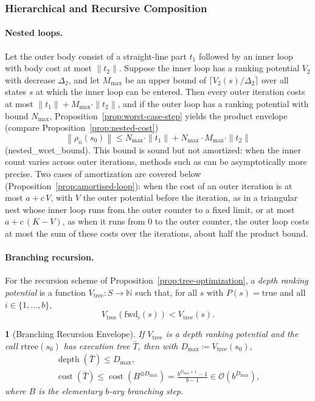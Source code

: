 \documentclass[oneside,english]{amsart}
\numberwithin{equation}{section}
\numberwithin{figure}{section}
\theoremstyle{plain}
\theoremstyle{definition}
\theoremstyle{plain}
\newtheorem{prop}[thm]{\protect\propositionname}
\theoremstyle{remark}
\theoremstyle{plain}
\theoremstyle{definition}
\theoremstyle{plain}
\theoremstyle{remark}
\DeclareMathOperator{\cost}{cost}
\DeclareMathOperator{\depth}{depth}
\newcommand{\lean}[1]{{\ttfamily\small #1}}
\providecommand{\propositionname}{Proposition}
\begin{document}
\subsubsection{Hierarchical and Recursive Composition}
\label{subsubsec:compositional-wcet}

\paragraph{Nested loops.}
Let the outer body consist of a straight-line part $t_1$ followed by an inner loop with body cost at most $\|t_2\|$. Suppose the inner loop has a ranking potential $V_2$ with decrease $\Delta_2$, and let $M_{\max}$ be an upper bound of $\lceil V_2(s)/\Delta_2 \rceil$ over all states $s$ at which the inner loop can be entered. Then every outer iteration costs at most $\|t_1\| + M_{\max} \cdot \|t_2\|$, and if the outer loop has a ranking potential with bound $N_{\max}$, Proposition~\ref{prop:worst-case-step} yields the product envelope (compare Proposition~\ref{prop:nested-cost})
\[
\left\|\rho_{\bar{n}}(s_0)\right\| \le N_{\max} \cdot \|t_1\| + N_{\max} \cdot M_{\max} \cdot \|t_2\|
\]
(\lean{nested\_\allowbreak wcet\_\allowbreak bound}). This bound is sound but not amortized: when the inner count varies across outer iterations, methods such as \cite{sinn2014complexity,hoffmann2012multivariate} can be asymptotically more precise. Two cases of amortization are covered below (Proposition~\ref{prop:amortised-loop}): when the cost of an outer iteration is at most $a + c\,V$, with $V$ the outer potential before the iteration, as in a triangular nest whose inner loop runs from the outer counter to a fixed limit, or at most $a + c\,(K - V)$, as when it runs from $0$ to the outer counter, the outer loop costs at most the sum of these costs over the iterations, about half the product bound.

\paragraph{Branching recursion.}
For the recursion scheme of Proposition~\ref{prop:tree-optimization}, a \textit{depth ranking potential} is a function $V_{\text{tree}} : S \to \mathbb{N}$ such that, for all $s$ with $P(s) = \text{true}$ and all $i \in \{1, \dots, b\}$,
\[
V_{\text{tree}}\left(\text{fwd}_i(s)\right) < V_{\text{tree}}(s).
\]

\begin{prop}[Branching Recursion Envelope]\label{prop:tree-envelope}
If $V_{\text{tree}}$ is a depth ranking potential and the call $\text{rtree}(s_0)$ has execution tree $\bar{T}$, then with $D_{\max} \coloneqq V_{\text{tree}}(s_0)$,
\begin{gather*}
\depth(\bar{T}) \le D_{\max}, \\
\cost(\bar{T}) \le \cost\left(B^{\otimes D_{\max}}\right) = \frac{b^{D_{\max} + 1} - 1}{b - 1} \in \mathcal{O}(b^{D_{\max}}),
\end{gather*}
where $B$ is the elementary $b$-ary branching step.
\end{prop}
\end{document}
